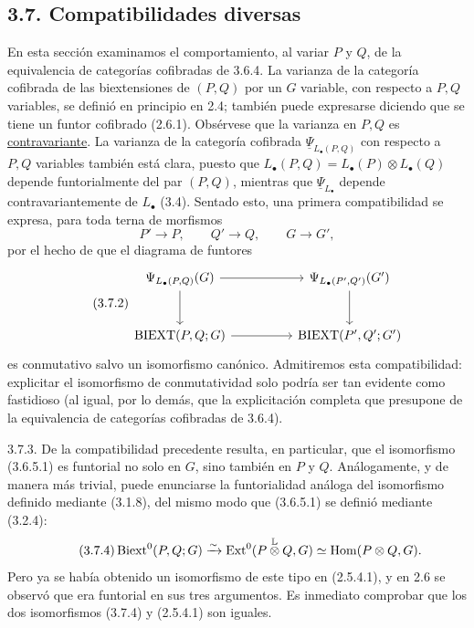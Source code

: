 
\subsection*{3.7. Compatibilidades diversas}

En esta sección examinamos el comportamiento, al variar $P$ y $Q$,
de la equivalencia de categorías cofibradas de 3.6.4. La varianza de
la categoría cofibrada de las biextensiones de $(P,Q)$ por un $G$
variable, con respecto a $P,Q$ variables, se definió en principio en
2.4; también puede expresarse diciendo que se tiene un funtor
cofibrado (2.6.1). Obsérvese que la varianza en $P,Q$ es
\underline{contravariante}. La varianza de la categoría cofibrada
$\underline\Psi_{L_\bullet(P,Q)}$ con respecto a $P,Q$ variables
también está clara, puesto que
$L_\bullet(P,Q)=L_\bullet(P)\otimes L_\bullet(Q)$ depende
funtorialmente del par $(P,Q)$, mientras que
$\underline\Psi_{L_\bullet}$ depende contravariantemente de
$L_\bullet$ (3.4). Sentado esto, una primera compatibilidad se expresa,
para toda terna de morfismos
\begin{equation}\tag{3.7.1}
 P'\longrightarrow P,\qquad
 Q'\longrightarrow Q,\qquad
 G\longrightarrow G',
\end{equation}
por el hecho de que el diagrama de funtores
\begin{equation}\tag{3.7.2}
\begin{tikzcd}[column sep=huge,row sep=large]
 \underline\Psi_{L_\bullet(P,Q)}(G)
   \arrow[r]\arrow[d]
 &\underline\Psi_{L_\bullet(P',Q')}(G')
   \arrow[d]\\
 \operatorname{BIEXT}(P,Q;G)
   \arrow[r]
 &\operatorname{BIEXT}(P',Q';G')
\end{tikzcd}
\end{equation}
es conmutativo salvo un isomorfismo canónico. Admitiremos esta
compatibilidad: explicitar el isomorfismo de conmutatividad solo podría
ser tan evidente como fastidioso (al igual, por lo demás, que la
explicitación completa que presupone de la equivalencia de categorías
cofibradas de 3.6.4).

3.7.3. De la compatibilidad precedente resulta, en particular, que el
isomorfismo (3.6.5.1) es funtorial no solo en $G$, sino también en $P$
y $Q$. Análogamente, y de manera más trivial, puede enunciarse la
funtorialidad análoga del isomorfismo definido mediante (3.1.8), del
mismo modo que (3.6.5.1) se definió mediante (3.2.4):
\begin{equation}\tag{3.7.4}
 \operatorname{Biext}^0(P,Q;G)
 \xrightarrow{\sim}
 \operatorname{Ext}^0(P\mathbin{\overset{\mathbb L}{\otimes}}Q,G)
 \simeq\operatorname{Hom}(P\otimes Q,G).
\end{equation}
Pero ya se había obtenido un isomorfismo de este tipo en (2.5.4.1), y
en 2.6 se observó que era funtorial en sus tres argumentos. Es
inmediato comprobar que los dos isomorfismos (3.7.4) y (2.5.4.1) son
iguales.

